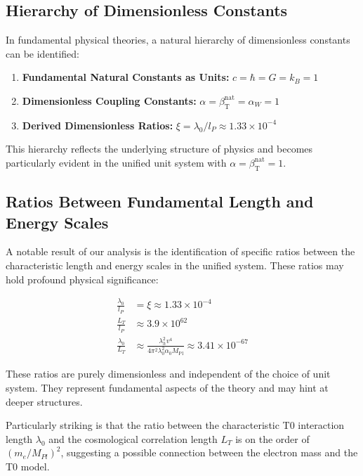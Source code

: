 ﻿\documentclass[12pt,a4paper]{article}
\newcommand{\betaT}{\beta_{\text{T}}}
\newcommand{\Mpl}{M_{\text{Pl}}}
\begin{document}
	\subsection{Hierarchy of Dimensionless Constants}
	
	In fundamental physical theories, a natural hierarchy of dimensionless constants can be identified:
	
	\begin{enumerate}[label=\arabic*.]
		\item \textbf{Fundamental Natural Constants as Units:} \(c = \hbar = G = k_B = 1\)
		\item \textbf{Dimensionless Coupling Constants:} \(\alpha = \betaT^{\text{nat}} = \alpha_W = 1\)
		\item \textbf{Derived Dimensionless Ratios:} \(\xi = \lambda_0/l_P \approx 1.33 \times 10^{-4}\)
	\end{enumerate}
	
	This hierarchy reflects the underlying structure of physics and becomes particularly evident in the unified unit system with \(\alpha = \betaT^{\text{nat}} = 1\).
	
	\subsection{Ratios Between Fundamental Length and Energy Scales}
	
	A notable result of our analysis is the identification of specific ratios between the characteristic length and energy scales in the unified system. These ratios may hold profound physical significance:
	
	\begin{tcolorbox}[colback=blue!5!white,colframe=blue!75!black,title=Fundamental Ratios in the Unified Unit System]
		\begin{align}
			\frac{\lambda_0}{l_P} &= \xi \approx 1.33 \times 10^{-4} \\
			\frac{L_T}{l_P} &\approx 3.9 \times 10^{62} \\
			\frac{\lambda_0}{L_T} &\approx \frac{\lambda_h^2 v^4}{4\pi^2 \lambda_0^2 \alpha_0 \Mpl} \approx 3.41 \times 10^{-67}
		\end{align}
	\end{tcolorbox}
	
	These ratios are purely dimensionless and independent of the choice of unit system. They represent fundamental aspects of the theory and may hint at deeper structures.
	
	Particularly striking is that the ratio between the characteristic T0 interaction length \(\lambda_0\) and the cosmological correlation length \(L_T\) is on the order of \((m_e/M_{Pl})^2\), suggesting a possible connection between the electron mass and the T0 model.
	
\end{document}
